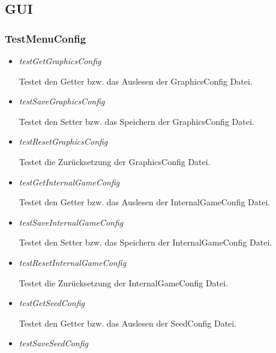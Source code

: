 \subsection{GUI}

\subsubsection{TestMenuConfig}
\begin{itemize}
    \item \textit{testGetGraphicsConfig}
        \begin{leftbar}[0.9\linewidth]
            Testet den Getter bzw. das Auslesen der GraphicsConfig Datei.
        \end{leftbar}
    \item \textit{testSaveGraphicsConfig}
        \begin{leftbar}[0.9\linewidth]
            Testet den Setter bzw. das Speichern der GraphicsConfig Datei.
        \end{leftbar}
    \item \textit{testResetGraphicsConfig}
        \begin{leftbar}[0.9\linewidth]
            Testet die Zurücksetzung der GraphicsConfig Datei.
        \end{leftbar}
    \item \textit{testGetInternalGameConfig}
        \begin{leftbar}[0.9\linewidth]
            Testet den Getter bzw. das Auslesen der InternalGameConfig Datei.
        \end{leftbar}
    \item \textit{testSaveInternalGameConfig}
        \begin{leftbar}[0.9\linewidth]
            Testet den Setter bzw. das Speichern der InternalGameConfig Datei.
        \end{leftbar}
    \item \textit{testResetInternalGameConfig}
        \begin{leftbar}[0.9\linewidth]
            Testet die Zurücksetzung der InternalGameConfig Datei.
        \end{leftbar}
    \item \textit{testGetSeedConfig}
        \begin{leftbar}[0.9\linewidth]
            Testet den Getter bzw. das Auslesen der SeedConfig Datei.
        \end{leftbar}
    \item \textit{testSaveSeedConfig}

\end{itemize}
